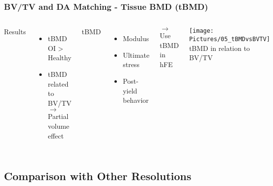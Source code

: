 \documentclass[xcolor=table,11pt]{beamer}
\begin{document}
\begin{frame}
	\frametitle{BV/TV and DA Matching - Tissue BMD (tBMD)}
	\fontsize{10pt}{10pt}\selectfont
	\begin{columns}
				
		Results
		\begin{itemize}
			\item tBMD OI > Healthy
			\item tBMD related to BV/TV\\
			$\rightarrow$ Partial volume effect
		\end{itemize}
	
		\vspace{10pt}

		\cite{p12} tBMD
		\begin{itemize}
			\item Modulus
			\item Ultimate stress
			\item Post-yield behavior
		\end{itemize}
		
		\vspace{10pt}
		
		$\rightarrow$ Use tBMD in hFE
		
		\centering
		\texttt{[image: Pictures/05\_tBMDvsBVTV]}\\
		tBMD in relation to BV/TV
	\end{columns}
\end{frame}


\subsection{Comparison with Other Resolutions}
\end{document}

